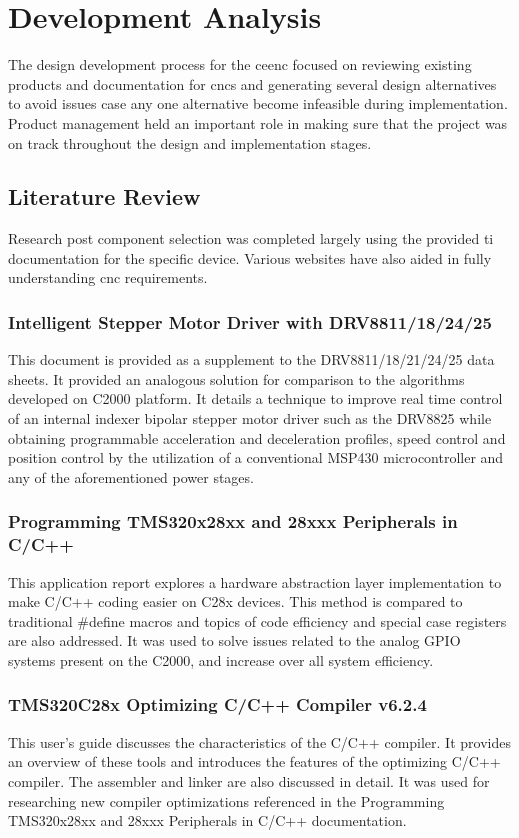 \chapter{Development Analysis}

The design development process for the \gls{ceenc} focused on reviewing existing products and documentation for \gls{cnc}s and generating several design alternatives to avoid issues case any one alternative become infeasible during implementation.
Product management held an important role in making sure that the project was on track throughout the design and implementation stages.

\section{Literature Review}
Research post component selection was completed largely using the provided \gls{ti} documentation for the specific device.
Various websites have also aided in fully understanding \gls{cnc} requirements.

\subsection{Intelligent Stepper Motor Driver with DRV8811/18/24/25}
This document is provided as a supplement to the DRV8811/18/21/24/25 data sheets. 
It provided an analogous solution for comparison to the algorithms developed on C2000 platform.
It details a technique to improve real time control of an internal indexer bipolar stepper motor driver such as the DRV8825 while obtaining programmable acceleration and deceleration profiles, speed control and position control by the utilization of a conventional MSP430 microcontroller and any of the aforementioned power stages\cite{dev_intelligent}.

\subsection{Programming TMS320x28xx and 28xxx Peripherals in C/C++}
This application report explores a hardware abstraction layer implementation to make C/C++ coding easier on C28x devices. 
This method is compared to traditional \#define macros and topics of code efficiency and special case registers are also addressed\cite{dev_peripherals}.
It was used to solve issues related to the analog GPIO systems present on the C2000, and increase over all system efficiency.

\subsection{TMS320C28x Optimizing C/C++ Compiler v6.2.4}
This user's guide discusses the characteristics of the C/C++ compiler.
It provides an overview of these tools and introduces the features of the optimizing C/C++ compiler. 
The assembler and linker are also discussed in detail\cite{dev_optimize}.
It was used for researching new compiler optimizations referenced in the Programming TMS320x28xx and 28xxx Peripherals in C/C++ documentation.

